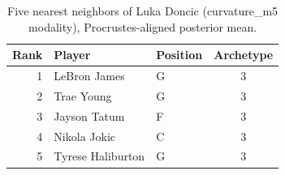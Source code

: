 \begin{table}[htbp]
  \centering\small
  \begin{tabular}{rllc}
    \toprule
    Rank & Player & Position & Archetype \\
    \midrule
    1 & LeBron James & G & 3 \\
    2 & Trae Young & G & 3 \\
    3 & Jayson Tatum & F & 3 \\
    4 & Nikola Jokic & C & 3 \\
    5 & Tyrese Haliburton & G & 3 \\
    \bottomrule
  \end{tabular}
  \caption{Five nearest neighbors of Luka Doncic (curvature_m5 modality), Procrustes-aligned posterior mean.}
  \label{tab:Luka_Doncic_neighbors_curvature_m5}
\end{table}

